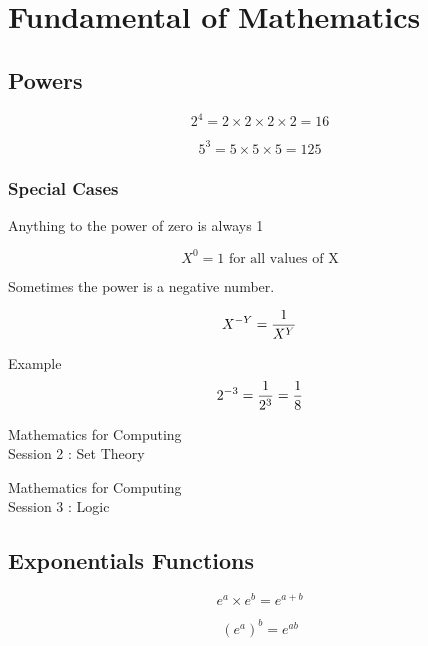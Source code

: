 \documentclass[a4paper,12pt]{article}
\begin{document}

\section{Fundamental of Mathematics}

\subsection{Powers}

\[  2^ 4 = 2 \times 2 \times 2 \times 2 = 16 \]

\[  5^ 3 = 5 \times 5 \times 5 =125 \]

\subsubsection{Special Cases}

Anything to the power of zero is always 1

\[  X^ 0 = 1 \mbox{ for all values of X} \]

Sometimes the power is a negative number.

\[  X^{-Y} = { 1 \over X^Y}  \]

Example 
\[  2^{-3} = { 1 \over 2^3} = { 1 \over 8}  \]


\newpage
\begin{center}
\huge{Mathematics for Computing}\\
{\LARGE Session 2 : Set Theory}
\end{center}



\newpage
\newpage
\begin{center}
\huge{Mathematics for Computing}\\
{\LARGE Session 3 : Logic}
\end{center}





\newpage

\subsection{Exponentials Functions}

\[ e^a \times e^b = e^{a+b}\]

\[ (e^a )^b = e^{ab}\]
\end{document}

